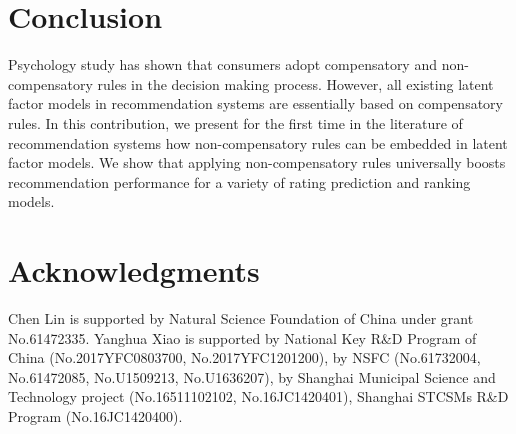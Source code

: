 \documentclass[letterpaper]{article} %
\begin{document}
\section{Conclusion}\label{sec:conclusion}
Psychology study has shown that consumers adopt compensatory and non-compensatory rules in the decision making process. However, all existing latent factor models in recommendation systems are essentially based on compensatory rules. In this contribution, we present for the first time in the literature of recommendation systems how non-compensatory rules can be embedded in latent factor models. We show that applying non-compensatory rules universally boosts recommendation performance for a variety of rating prediction and ranking models. 

\section{ Acknowledgments}
Chen Lin is supported by Natural Science Foundation of China under grant No.61472335. Yanghua Xiao is supported by National Key R\&D Program of China (No.2017YFC0803700, No.2017YFC1201200), by NSFC (No.61732004, No.61472085, No.U1509213, No.U1636207), by Shanghai Municipal Science and Technology project (No.16511102102, No.16JC1420401), Shanghai STCSMs R\&D Program (No.16JC1420400).


\end{document}
